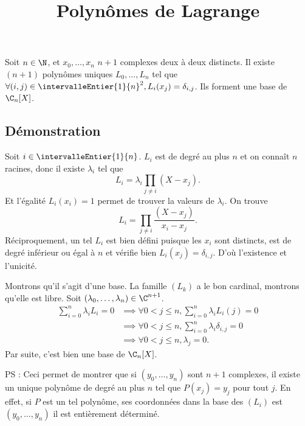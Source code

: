 \documentclass[fontsize=12pt,twoside=false,parskip=half, french]{scrartcl}
\title{Polynômes de Lagrange}
\date{}
\author{}
\begin{document}
\maketitle
   \begin{Theoreme}
      Soit $n \in \N$, et $x_0, \ldots, x_n$ $n + 1$ complexes deux à deux distincts.
      Il existe $(n + 1)$ polynômes uniques $L_0, \ldots, L_n$ tel que 
      $\forall (i, j) \in \intervalleEntier{1}{n}^2, L_i(x_j) = \delta_{i, j}$.
      Ils forment une base de $\C_n[X]$.
   \end{Theoreme}
   \subsection{Démonstration}
      Soit $i \in \intervalleEntier{1}{n}$. $L_i$ est de degré au plus $n$ et on connaît $n$ racines, donc il existe $\lambda_i$ tel que
      \[
         L_i = \lambda_i\prod_{j \neq i} (X - x_j).
      \]
      Et l’égalité $L_i(x_i) = 1$ permet de trouver la valeurs de $\lambda_i$. On
      trouve
      \[
         L_i = \prod_{j \neq i} \frac{(X - x_j)}{x_i - x_j}.
      \]
      Réciproquement, un tel $L_i$ est bien défini puisque les $x_i$ sont 
      distincts, est de degré inférieur ou égal à $n$ et vérifie bien 
      $L_i(x_j) = \delta_{i, j}$. D’où l’existence et l’unicité.
      
      Montrons qu’il s’agit d’une base. La famille $(L_k)$ a le bon cardinal,
      montrons qu’elle est libre. Soit $(\lambda_0, \ldots, \lambda_n) \in \C^{n + 1}$.
      \begin{align*}
         \sum_{i = 0}^n \lambda_i L_i = 0 
              & \implies \forall 0 < j \leq n, \sum_{i = 0}^n \lambda_i L_i(j) = 0\\
              & \implies \forall 0 < j \leq n, \sum_{i = 0}^n \lambda_i \delta_{i, j} = 0\\
              & \implies \forall 0 < j \leq n, \lambda_j = 0.
      \end{align*}
      Par suite, c’est bien une base de $\C_n[X]$.
      
      PS : Ceci permet de montrer que si $(y_0, \ldots, y_n)$ sont $n + 1$ complexes,
      il existe un unique polynôme de degré au plus $n$ tel que $P(x_j) = y_j$ pour tout
      $j$. En effet, si $P$ est un tel polynôme, ses coordonnées dans la base
      des $(L_i)$ est $(y_0, \ldots, y_n)$ \ie il est entièrement déterminé.  
\end{document}
